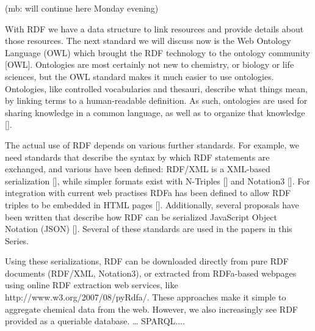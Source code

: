 \documentclass[10pt]{bmc_article}
\newenvironment{bmcformat}{\begin{raggedright}\baselineskip20pt\sloppy\setboolean{publ}{false}}{\end{raggedright}\baselineskip20pt\sloppy}
\begin{document}
\begin{bmcformat}
(mb: will continue here Monday evening)

With RDF we have a data structure to link resources and provide details about
those resources. The next standard we will discuss now is the Web Ontology
Language (OWL) which brought the RDF technology to the ontology community [OWL].
Ontologies are most certainly not new to chemistry, or biology or life sciences,
but the OWL standard makes it much easier to use ontologies. Ontologies, like
controlled vocabularies and thesauri, describe what things mean, by linking
terms to a human-readable definition. As such, ontologies are used for sharing
knowledge in a common language, as well as to organize that knowledge []. 

The actual use of RDF depends on various further standards. For example, we need
standards that describe the syntax by which RDF statements are exchanged, and
various have been defined: RDF/XML is a XML-based serialization [], while
simpler formats exist with N-Triples [] and Notation3 []. For integration with
current web practises RDFa has been defined to allow RDF triples to be embedded
in HTML pages []. Additionally, several proposals have been written that
describe how RDF can be serialized JavaScript Object Notation (JSON) []. Several
of these standards are used in the papers in this Series.

Using these serializations, RDF can be downloaded directly from pure RDF
documents (RDF/XML, Notation3), or extracted from RDFa-based webpages using
online RDF extraction web services, like http://www.w3.org/2007/08/pyRdfa/.
These approaches make it simple to aggregate chemical data from the web.
However, we also increasingly see RDF provided as a queriable database. …
SPARQL....



\end{bmcformat}
\end{document}
